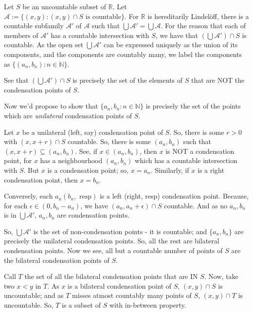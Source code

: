 \documentclass[12pt]{article}
\begin{document}
Let $S$ be an uncountable subset of $\mathbb R$.
Let $\mathscr A:=\{(x,y):(x,y)\cap S \mbox{ is countable}\}$. For $\mathbb R$ is hereditarily Lindel\"{o}ff, there is a countable subfamily $\mathscr A'$ of $\mathscr A$ such that $\bigcup\mathscr A'=\bigcup\mathscr A$. For the reason that each of members of $\mathscr A'$ has a countable intersection with $S$, we have that $(\bigcup\mathscr A')\cap S$ is countable. As the open set $\bigcup\mathscr A'$ can be expressed uniquely as the union of its components, and the components are countably many, we label the components as $\{(a_n,b_n):n\in\mathbb N\}$. 


See that $(\bigcup\mathscr A')\cap S$ is precisely the set of the elements of $S$ that are NOT the condensation points of $S$.

Now we'd propose to show that $\{a_n,b_n:n\in\mathbb N\}$ is precisely the set of the points which are {\em unilateral} condensation points of $S$.

Let $x$ be a unilateral (left, say) condensation point of $S$. So, there is some $r>0$ with $(x,x+r)\cap S$ countable. So, there is some $(a_n,b_n)$ such that $(x,x+r)\subseteq (a_n,b_n)$. See, if $x\in (a_n,b_n)$, then $x$ is NOT a condensation point, for $x$ has a neighbourhood $(a_n,b_n)$ which has a countable intersection with $S$. But $x$ is a condensation point; so, $x=a_n$. Similarly, if $x$ is a right condensation point, then $x=b_n$.

Conversely, each $a_n(b_n,\mbox{ resp})$ is a left (right, resp) condensation point. Because, for each $\epsilon\in (0,b_n-a_n)$, we have $(a_n,a_n+\epsilon)\cap S$ countable. And as no $a_n,b_n$ is in $\bigcup\mathscr A'$, $a_n,b_n$ are condensation points.

So, $\bigcup\mathscr A'$ is the set of non-condensation points - it is countable; and $\{a_n,b_n\}$ are precisely the unilateral condensation points. So, all the rest are bilateral condensation points. Now we see, all but a countable number of points of $S$ are the bilateral condensation points of $S$. 

Call $T$ the set of all the bilateral condensation points that are IN $S$. Now, take two $x<y$ in $T$. As $x$ is a bilateral condensation point of $S$, $(x,y)\cap S$ is uncountable; and as $T$ misses atmost countably many points of $S$, $(x,y)\cap T$ is uncountable. So, $T$ is a subset of $S$ with in-between property.
\end{document}
